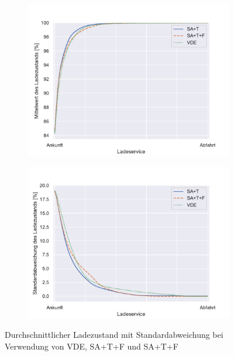 \begin{figure}
	\begin{subfigure}{0.49\linewidth}
		\includegraphics[width=\linewidth]{img/ohneTrafo/SlottedAloha_participants_VDE_tau_13_soc_mean.pdf}
        \label{ABB_ot_SocMEAN}
	\end{subfigure}
	\begin{subfigure}{0.49\linewidth}
		\includegraphics[width=\linewidth]{img/ohneTrafo/SlottedAloha_participants_VDE_tau_13_soc_std.pdf}
        \label{ABB_oT_SocSTD}
	\end{subfigure}
	\caption{Durchschnittlicher Ladezustand mit Standardabweichung bei Verwendung von VDE, SA+T+F und SA+T+F}
\end{figure}

